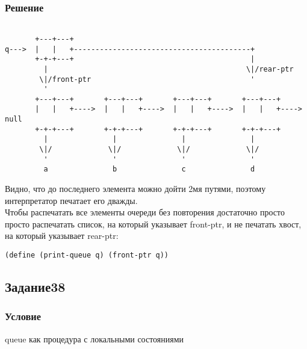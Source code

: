 \documentclass[10pt,a4paper]{article}
\begin{document}
\subsubsection*{Решение}
\begin{lstlisting}

       +---+---+
q--->  |   |   +-----------------------------------------+
       +-+-+---+                                         |
         |                                              \|/rear-ptr
        \|/front-ptr                                     '
         '
       +---+---+       +---+---+       +---+---+       +---+---+
       |   |   +---->  |   |   +---->  |   |   +---->  |   |   +---->  null
       +-+-+---+       +-+-+---+       +-+-+---+       +-+-+---+
         |               |               |               |
        \|/             \|/             \|/             \|/
         '               '               '               '
         a               b               c               d

\end{lstlisting}
Видно, что до последнего элемента можно дойти 2мя путями, поэтому
интерпретатор печатает его дважды. \\
Чтобы распечатать все элементы очереди без повторения достаточно
просто просто распечатать список, на который указывает front-ptr, и не
печатать хвост, на который указывает rear-ptr:
\begin{lstlisting}
(define (print-queue q) (front-ptr q))
\end{lstlisting}

\subsection*{Задание38}
\subsubsection*{Условие}
queue как процедура с локальными состояниями
\end{document}
